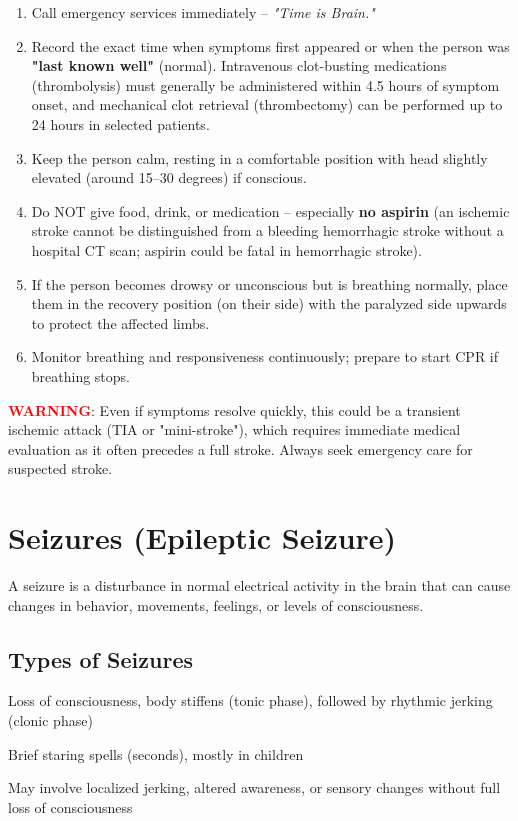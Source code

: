 \begin{enumerate}[leftmargin=*]
\item Call emergency services immediately -- \emph{"Time is Brain."}
\item Record the exact time when symptoms first appeared or when the person was \textbf{"last known well"} (normal). Intravenous clot-busting medications (thrombolysis) must generally be administered within 4.5 hours of symptom onset, and mechanical clot retrieval (thrombectomy) can be performed up to 24 hours in selected patients.
\item Keep the person calm, resting in a comfortable position with head slightly elevated (around 15--30 degrees) if conscious.
\item Do NOT give food, drink, or medication -- especially \textbf{no aspirin} (an ischemic stroke cannot be distinguished from a bleeding hemorrhagic stroke without a hospital CT scan; aspirin could be fatal in hemorrhagic stroke).
\item If the person becomes drowsy or unconscious but is breathing normally, place them in the recovery position (on their side) with the paralyzed side upwards to protect the affected limbs.
\item Monitor breathing and responsiveness continuously; prepare to start CPR if breathing stops.
\end{enumerate}
\noindent\textbf{\textcolor{red}{WARNING}}: Even if symptoms resolve quickly, this could be a transient ischemic attack (TIA or "mini-stroke"), which requires immediate medical evaluation as it often precedes a full stroke. Always seek emergency care for suspected stroke.

\section{Seizures (Epileptic Seizure)}

A seizure is a disturbance in normal electrical activity in the brain that can cause changes in behavior, movements, feelings, or levels of consciousness.

\subsection{Types of Seizures}

\begin{description}[leftmargin=!]
  \item[Generalized Tonic-Clonic (Grand Mal)] Loss of consciousness, body stiffens (tonic phase), followed by rhythmic jerking (clonic phase)
  \item[Absence (Petit Mal)] Brief staring spells (seconds), mostly in children
  \item[Partial/Focal] May involve localized jerking, altered awareness, or sensory changes without full loss of consciousness
\end{description}

